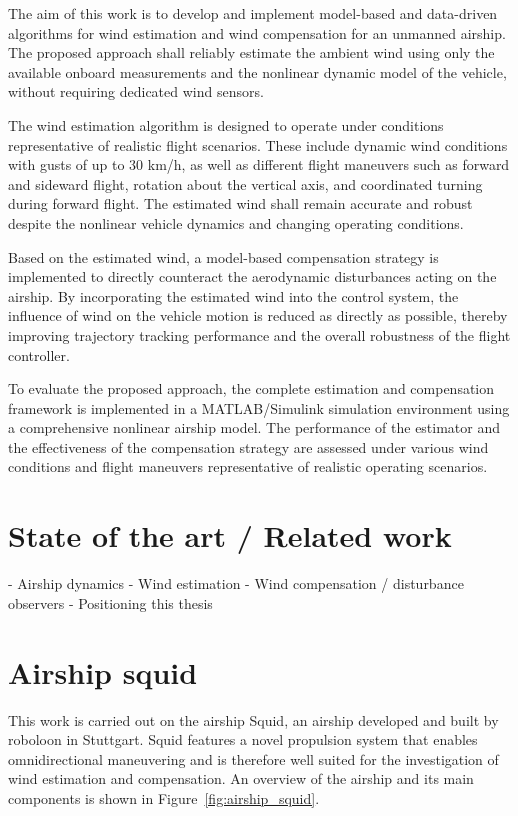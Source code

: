 The aim of this work is to develop and implement model-based and data-driven algorithms for wind estimation and wind compensation for an unmanned airship. The proposed approach shall reliably estimate the ambient wind using only the available onboard measurements and the nonlinear dynamic model of the vehicle, without requiring dedicated wind sensors.

The wind estimation algorithm is designed to operate under conditions representative of realistic flight scenarios. These include dynamic wind conditions with gusts of up to 30 km/h, as well as different flight maneuvers such as forward and sideward flight, rotation about the vertical axis, and coordinated turning during forward flight. The estimated wind shall remain accurate and robust despite the nonlinear vehicle dynamics and changing operating conditions.

Based on the estimated wind, a model-based compensation strategy is implemented to directly counteract the aerodynamic disturbances acting on the airship. By incorporating the estimated wind into the control system, the influence of wind on the vehicle motion is reduced as directly as possible, thereby improving trajectory tracking performance and the overall robustness of the flight controller.

To evaluate the proposed approach, the complete estimation and compensation framework is implemented in a MATLAB/Simulink simulation environment using a comprehensive nonlinear airship model. The performance of the estimator and the effectiveness of the compensation strategy are assessed under various wind conditions and flight maneuvers representative of realistic operating scenarios.





\section{State of the art / Related work}
\label{sec:RelatedWork}
- Airship dynamics
- Wind estimation
- Wind compensation / disturbance observers
- Positioning this thesis





\section{Airship squid}

This work is carried out on the airship Squid, an airship developed and built by roboloon in Stuttgart. Squid features a novel propulsion system that enables omnidirectional maneuvering and is therefore well suited for the investigation of wind estimation and compensation. An overview of the airship and its main components is shown in Figure~\ref{fig:airship_squid}.

